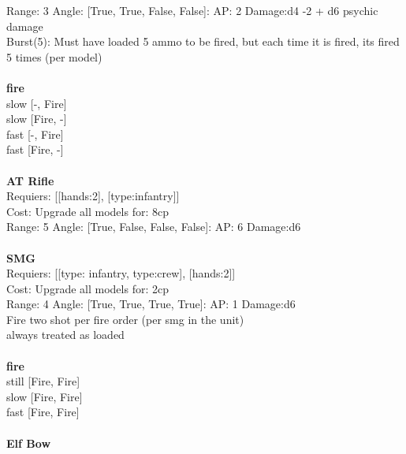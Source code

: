 Range: 3  Angle: [True, True, False, False]: AP: 2 Damage:d4 -2 + d6 psychic damage \\
Burst(5): Must have loaded 5 ammo to be fired, but each time it is fired, its fired 5 times (per model)\\ 







\ \\ {\bf fire } \\
slow [-, Fire] \\
slow [Fire, -] \\
fast [-, Fire] \\
fast [Fire, -] \\

\ \\
{\bf AT Rifle } \\

Requiers: [[hands:2], [type:infantry]] \\
Cost: Upgrade all models for: 8cp \\


Range: 5  Angle: [True, False, False, False]: AP: 6 Damage:d6 \\








\ \\
{\bf SMG } \\

Requiers: [[type: infantry, type:crew], [hands:2]] \\
Cost: Upgrade all models for: 2cp \\


Range: 4  Angle: [True, True, True, True]: AP: 1 Damage:d6 \\
Fire two shot per fire order (per smg in the unit)\\ 
always treated as loaded\\ 







\ \\ {\bf fire } \\
still [Fire, Fire] \\
slow [Fire, Fire] \\
fast [Fire, Fire] \\

\ \\
{\bf Elf Bow } \\

